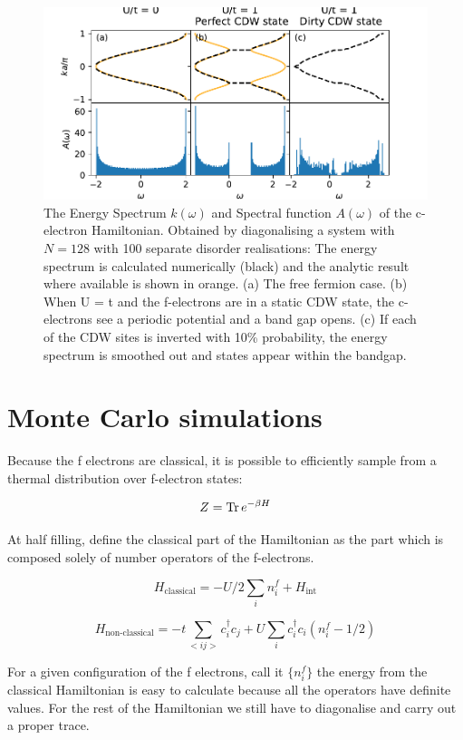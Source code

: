 \documentclass[a4paper, 11pt, onecolumn]{article}
\begin{document}
\begin{figure}
  \centering
    \includegraphics[width=\textwidth]{DoS.pdf}
  \caption{The Energy Spectrum $k(\omega)$ and Spectral function $A(\omega)$ of the c-electron Hamiltonian. Obtained by diagonalising a system with $N = 128$ with 100 separate disorder realisations: The energy spectrum is calculated numerically (black) and the analytic result where available is shown in orange. (a) The free fermion case. (b) When U = t and the f-electrons are in a static CDW state, the c-electrons see a periodic potential and a band gap opens. (c) If each of the CDW sites is inverted with 10\% probability, the energy spectrum is smoothed out and states appear within the bandgap.}
  \label{fig:dos}
\end{figure}

\section{Monte Carlo simulations}
Because the f electrons are classical, it is possible to efficiently sample from a thermal distribution over f-electron states:


$$ Z = \Tr e^{-\beta H} $$

At half filling, define the classical part of the Hamiltonian as the part which is composed solely of number operators of the f-electrons.

$$ H_{\text{classical}} = -U/2 \sum_i n^f_i + H_{\text{int}}$$

$$ H_{\text{non-classical}} = - t \sum_{<ij>} c^\dagger_i c_j + U \sum_{i} c^\dagger_i c_i (n^f_i - 1/2) $$

For a given configuration of the f electrons, call it  \(\{ n^f_i \}\)  the energy from the classical Hamiltonian is easy to calculate because all the operators have definite values. For the rest of the Hamiltonian we still have to diagonalise and carry out a proper trace.
\end{document}
